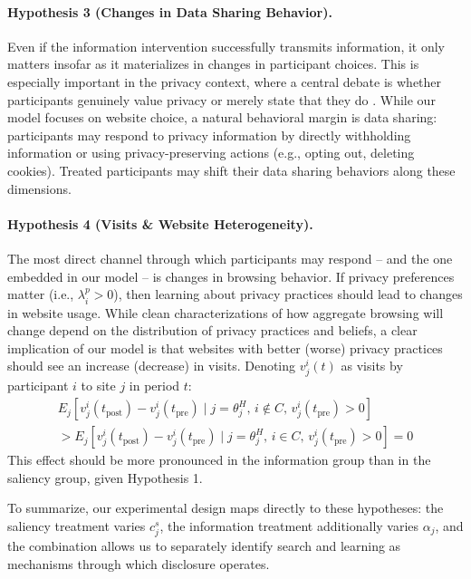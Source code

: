 \documentclass[12pt]{article}
\theoremstyle{definition}
\theoremstyle{remark}
\begin{document}
\paragraph{Hypothesis 3 (Changes in Data Sharing Behavior).}
Even if the information intervention successfully transmits information, it only matters insofar as it materializes in changes in participant choices. This is especially important in the privacy context, where a central debate is whether participants genuinely value privacy or merely state that they do \citep{f4d6c48d-b77c-3568-b51c-5946aee2b9de, athey2025digital}. While our model focuses on website choice, a natural behavioral margin is data sharing: participants may respond to privacy information by directly withholding information or using privacy-preserving actions (e.g., opting out, deleting cookies). Treated participants may shift their data sharing behaviors along these dimensions.

\paragraph{Hypothesis 4 (Visits \& Website Heterogeneity).}
The most direct channel through which participants may respond -- and the one embedded in our model -- is changes in browsing behavior. If privacy preferences matter (i.e., $\lambda^p_i > 0$), then learning about privacy practices should lead to changes in website usage. While clean characterizations of how aggregate browsing will change depend on the distribution of privacy practices and beliefs, a clear implication of our model is that websites with better (worse) privacy practices should see an increase (decrease) in visits. Denoting $v^i_j(t)$ as visits by participant $i$ to site $j$ in period $t$:
\begin{align*}
    E_j\left[v^i_j(t_{\text{post}}) - v^i_j(t_{\text{pre}}) \mid j = \theta^H_j, \, i \notin C, \, v^i_j(t_{\text{pre}}) > 0\right] \\
    > E_j\left[v^i_j(t_{\text{post}}) - v^i_j(t_{\text{pre}}) \mid j = \theta^H_j, \, i \in C, \, v^i_j(t_{\text{pre}}) > 0\right] = 0
\end{align*}
This effect should be more pronounced in the information group than in the saliency group, given Hypothesis 1.

\medskip
 
\noindent To summarize, our experimental design maps directly to these hypotheses: the saliency treatment varies $c^s_j$, the information treatment additionally varies $\alpha_j$, and the combination allows us to separately identify search and learning as mechanisms through which disclosure operates.
\end{document}
